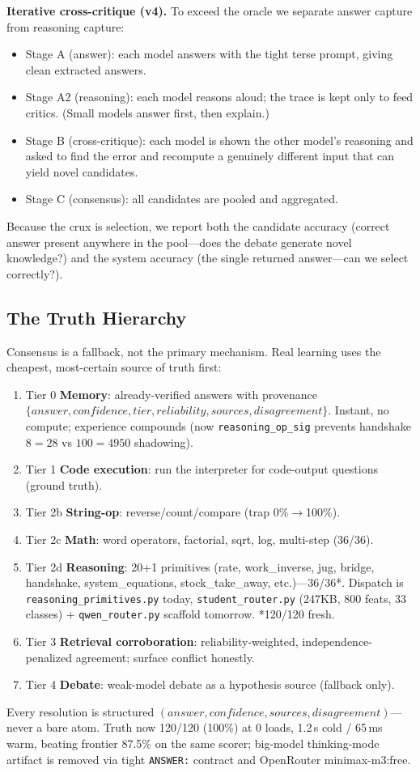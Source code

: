\documentclass[conference,compsoc]{IEEEtran}
\begin{document}
\textbf{Iterative cross-critique (v4).} To exceed the oracle we separate answer capture from reasoning capture:
\begin{itemize}
\item Stage A (answer): each model answers with the tight terse prompt, giving clean extracted answers.
\item Stage A2 (reasoning): each model reasons aloud; the trace is kept only to feed critics. (Small models answer first, then explain.)
\item Stage B (cross-critique): each model is shown the other model's reasoning and asked to find the error and recompute a genuinely different input that can yield novel candidates.
\item Stage C (consensus): all candidates are pooled and aggregated.
\end{itemize}
Because the crux is selection, we report both the candidate accuracy (correct answer present anywhere in the pool---does the debate generate novel knowledge?) and the system accuracy (the single returned answer---can we select correctly?).

\subsection{The Truth Hierarchy}
Consensus is a fallback, not the primary mechanism. Real learning uses the cheapest, most-certain source of truth first:
\begin{enumerate}
\item Tier 0 \textbf{Memory}: already-verified answers with provenance $\{answer, confidence, tier, reliability, sources, disagreement\}$. Instant, no compute; experience compounds (now \texttt{reasoning\_op\_sig} prevents handshake $8\!=\!28$ vs $100\!=\!4950$ shadowing).
\item Tier 1 \textbf{Code execution}: run the interpreter for code-output questions (ground truth).
\item Tier 2b \textbf{String-op}: reverse/count/compare (trap 0\%$\rightarrow$100\%).
\item Tier 2c \textbf{Math}: word operators, factorial, sqrt, log, multi-step (36/36).
\item Tier 2d \textbf{Reasoning}: 20+1 primitives (rate, work\_inverse, jug, bridge, handshake, system\_equations, stock\_take\_away, etc.)---36/36*. Dispatch is \texttt{reasoning\_primitives.py} today, \texttt{student\_router.py} (247KB, 800 feats, 33 classes) + \texttt{qwen\_router.py} scaffold tomorrow. *120/120 fresh.
\item Tier 3 \textbf{Retrieval corroboration}: reliability-weighted, independence-penalized agreement; surface conflict honestly.
\item Tier 4 \textbf{Debate}: weak-model debate as a hypothesis source (fallback only).
\end{enumerate}
Every resolution is structured $(answer, confidence, sources, disagreement)$---never a bare atom. Truth now 120/120 (100\%) at 0 loads, 1.2\,s cold / 65\,ms warm, beating frontier 87.5\% on the same scorer; big-model thinking-mode artifact is removed via tight \texttt{ANSWER:} contract and OpenRouter minimax-m3:free.
\end{document}

